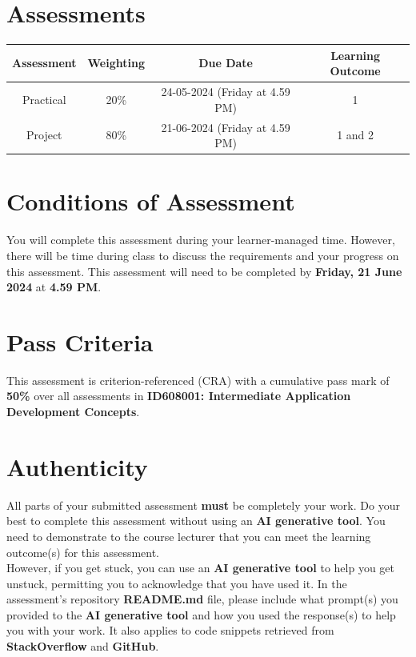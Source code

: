\documentclass{article}
\begin{document}
\section*{Assessments}
\renewcommand{\arraystretch}{1.5}
\begin{tabular}{|c|c|c|c|}
	\hline
	\textbf{Assessment}                                 & \textbf{Weighting} & \textbf{Due Date}            & \textbf{Learning Outcome} \\ \hline
	\small Practical & \small 20\%        & \small 24-05-2024 (Friday at 4.59 PM)   & \small 1                   \\ \hline
	\small Project                 & \small 80\%        & \small 21-06-2024 (Friday at 4.59 PM) \small  & \small 1 and 2                   \\ \hline
\end{tabular}

\section*{Conditions of Assessment}
You will complete this assessment during your learner-managed time. However, there will be time during class to discuss the requirements and your progress on this assessment. This assessment will need to be completed by \textbf{Friday, 21 June 2024} at \textbf{4.59 PM}. 

\section*{Pass Criteria}
This assessment is criterion-referenced (CRA) with a cumulative pass mark of \textbf{50\%} over all assessments in \textbf{ID608001: Intermediate Application Development Concepts}.

\section*{Authenticity}
All parts of your submitted assessment \textbf{must} be completely your work. Do your best to complete this assessment without using an \textbf{AI generative tool}. You need to demonstrate to the course lecturer that you can meet the learning outcome(s) for this assessment. \\
 
 However, if you get stuck, you can use an \textbf{AI generative tool} to help you get unstuck, permitting you to acknowledge that you have used it. In the assessment's repository \textbf{README.md} file, please include what prompt(s) you provided to the \textbf{AI generative tool} and how you used the response(s) to help you with your work. It also applies to code snippets retrieved from \textbf{StackOverflow} and \textbf{GitHub}. \\
 
\end{document}
